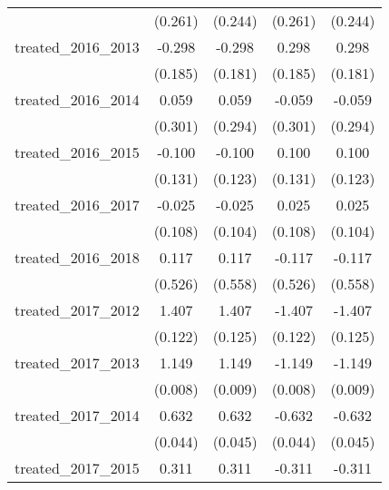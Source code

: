 {\begin{tabular}{l*{4}{c}}
            &     (0.261)         &     (0.244)         &     (0.261)         &     (0.244)         \\
[1em]
treated\_2016\_2013&      -0.298         &      -0.298         &       0.298         &       0.298         \\
            &     (0.185)         &     (0.181)         &     (0.185)         &     (0.181)         \\
[1em]
treated\_2016\_2014&       0.059         &       0.059         &      -0.059         &      -0.059         \\
            &     (0.301)         &     (0.294)         &     (0.301)         &     (0.294)         \\
[1em]
treated\_2016\_2015&      -0.100         &      -0.100         &       0.100         &       0.100         \\
            &     (0.131)         &     (0.123)         &     (0.131)         &     (0.123)         \\
[1em]
treated\_2016\_2017&      -0.025         &      -0.025         &       0.025         &       0.025         \\
            &     (0.108)         &     (0.104)         &     (0.108)         &     (0.104)         \\
[1em]
treated\_2016\_2018&       0.117         &       0.117         &      -0.117         &      -0.117         \\
            &     (0.526)         &     (0.558)         &     (0.526)         &     (0.558)         \\
[1em]
treated\_2017\_2012&       1.407\sym{***}&       1.407\sym{***}&      -1.407\sym{***}&      -1.407\sym{***}\\
            &     (0.122)         &     (0.125)         &     (0.122)         &     (0.125)         \\
[1em]
treated\_2017\_2013&       1.149\sym{***}&       1.149\sym{***}&      -1.149\sym{***}&      -1.149\sym{***}\\
            &     (0.008)         &     (0.009)         &     (0.008)         &     (0.009)         \\
[1em]
treated\_2017\_2014&       0.632\sym{***}&       0.632\sym{***}&      -0.632\sym{***}&      -0.632\sym{***}\\
            &     (0.044)         &     (0.045)         &     (0.044)         &     (0.045)         \\
[1em]
treated\_2017\_2015&       0.311\sym{***}&       0.311\sym{***}&      -0.311\sym{***}&      -0.311\sym{***}\\

\end{tabular}}
